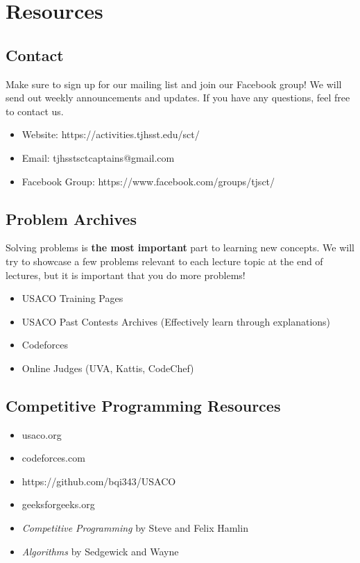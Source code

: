 \documentclass[11pt]{article}
\begin{document}
\section{Resources}
\subsection{Contact}
    Make sure to sign up for our mailing list and join our Facebook group! We will send out weekly announcements and updates. If you have any questions, feel free to contact us.
\begin{itemize}
  \item Website: https://activities.tjhsst.edu/sct/
  \item Email: tjhsstsctcaptains@gmail.com
  \item Facebook Group: https://www.facebook.com/groups/tjsct/
\end{itemize}

\subsection{Problem Archives}
    Solving problems is \textbf{the most important} part to learning new concepts. We will try to showcase a few problems relevant to each lecture topic at the end of lectures, but it is important that you do more problems!
\begin{itemize}
  \item USACO Training Pages
  \item USACO Past Contests Archives (Effectively learn through explanations)
  \item Codeforces
  \item Online Judges (UVA, Kattis, CodeChef)
\end{itemize}

\subsection{Competitive Programming Resources}
\begin{itemize}
  \item usaco.org
  \item codeforces.com
  \item https://github.com/bqi343/USACO
  \item geeksforgeeks.org
  \item \textit{Competitive Programming} by Steve and Felix Hamlin 
  \item \textit{Algorithms} by Sedgewick and Wayne
\end{itemize}
\end{document}
